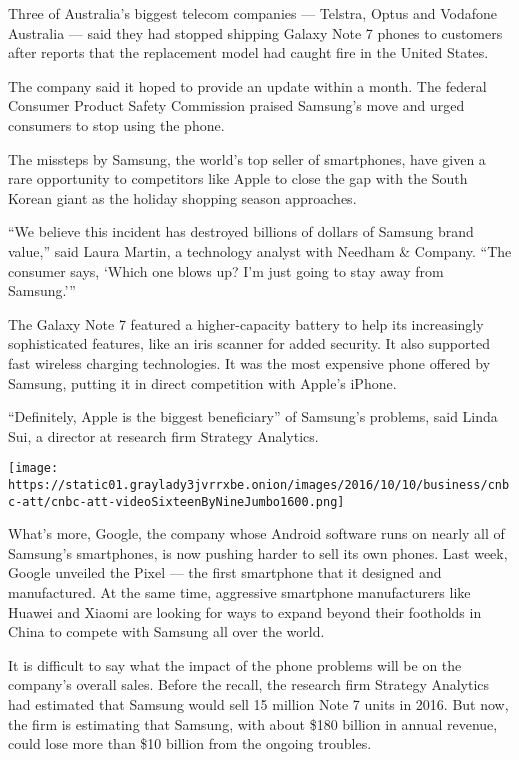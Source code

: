 Three of Australia's biggest telecom companies --- Telstra, Optus and
Vodafone Australia --- said they had stopped shipping Galaxy Note 7
phones to customers after reports that the replacement model had caught
fire in the United States.

The company said it hoped to provide an update within a month. The
federal Consumer Product Safety Commission praised Samsung's move and
urged consumers to stop using the phone.

The missteps by Samsung, the world's top seller of smartphones, have
given a rare opportunity to competitors like Apple to close the gap with
the South Korean giant as the holiday shopping season approaches.

``We believe this incident has destroyed billions of dollars of Samsung
brand value,'' said Laura Martin, a technology analyst with Needham \&
Company. ``The consumer says, `Which one blows up? I'm just going to
stay away from Samsung.'''

The Galaxy Note 7 featured a higher-capacity battery to help its
increasingly sophisticated features, like an iris scanner for added
security. It also supported fast wireless charging technologies. It was
the most expensive phone offered by Samsung, putting it in direct
competition with Apple's iPhone.

``Definitely, Apple is the biggest beneficiary'' of Samsung's problems,
said Linda Sui, a director at research firm Strategy Analytics.

\texttt{[image: https://static01.graylady3jvrrxbe.onion/images/2016/10/10/business/cnbc-att/cnbc-att-videoSixteenByNineJumbo1600.png]}

What's more, Google, the company whose Android software runs on nearly
all of Samsung's smartphones, is now pushing harder to sell its own
phones. Last week, Google unveiled the Pixel --- the first smartphone
that it designed and manufactured. At the same time, aggressive
smartphone manufacturers like Huawei and Xiaomi are looking for ways to
expand beyond their footholds in China to compete with Samsung all over
the world.

It is difficult to say what the impact of the phone problems will be on
the company's overall sales. Before the recall, the research firm
Strategy Analytics had estimated that Samsung would sell 15 million Note
7 units in 2016. But now, the firm is estimating that Samsung, with
about \$180 billion in annual revenue, could lose more than \$10 billion
from the ongoing troubles.

